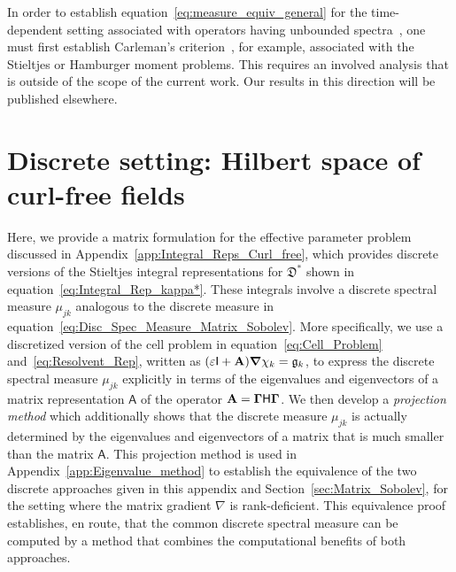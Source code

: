 \documentclass[english,12pt,jmp,graphicx]{revtex4-1}
\newcommand{\vecg}{\mathfrak{g}}
\newcommand{\secref}[1]{Section~\ref{#1}}
\newcommand{\appref}[1]{Appendix~\ref{#1}}
\newcommand{\bnabla}{\mbox{\boldmath${\nabla}$}}
\newcommand{\bGamma}{\mbox{\boldmath${\Gamma}$}}
\newcommand{\Dg}{\mathfrak{D}}
\newcommand{\Hm}{\mathsf{H}}
\newcommand{\Am}{\mathsf{A}}
\newcommand{\Ib}{\mathsf{I}}
\newcommand{\Ab}{\mathbf{A}}
\begin{document}
In order to establish equation~\eqref{eq:measure_equiv_general} for 
the time-dependent setting associated with operators having unbounded 
spectra~\cite{Murphy:ADSTPF-2017}, one must first establish 
Carleman's criterion~\cite{Akhiezer:Book:1965}, for example, 
associated with the Stieltjes or Hamburger moment problems. 
This requires an involved analysis that is outside of the scope of 
the current work. Our results in this direction will be published 
elsewhere. 









\section{Discrete setting:  Hilbert space of curl-free fields}
\label{app:Matrix_Formulation_Curl} 
% 
Here, we provide a matrix formulation for the effective parameter
problem discussed in \appref{app:Integral_Reps_Curl_free}, which
provides discrete versions of the Stieltjes integral representations
for $\Dg^*$ shown in equation~\eqref{eq:Integral_Rep_kappa*}. These
integrals involve a discrete spectral measure $\mu_{jk}$ analogous to
the discrete measure in
equation~\eqref{eq:Disc_Spec_Measure_Matrix_Sobolev}. More
specifically, we use a discretized version of the cell problem in
equation~\eqref{eq:Cell_Problem}  
and~\eqref{eq:Resolvent_Rep}, written as
$(\varepsilon\Ib+\Ab)\bnabla\chi_k=\vecg_k$, to express the discrete 
spectral measure $\mu_{jk}$ explicitly in terms of the eigenvalues and
eigenvectors of a matrix representation $\Am$ of the 
operator $\Ab=\bGamma\Hm\bGamma$. We then develop a \emph{projection
  method} which additionally shows that the discrete measure $\mu_{jk}$
is actually determined by the eigenvalues and eigenvectors of a matrix
that is much smaller than the matrix $\Am$. This projection method is
used in \appref{app:Eigenvalue_method} to establish the equivalence of the
two discrete approaches given in this appendix and
\secref{sec:Matrix_Sobolev}, for the setting where the matrix gradient
$\nabla$ is rank-deficient. This equivalence proof establishes, en route, that
the common discrete spectral measure can be computed by a method that
combines the computational benefits of both approaches.
\end{document}
